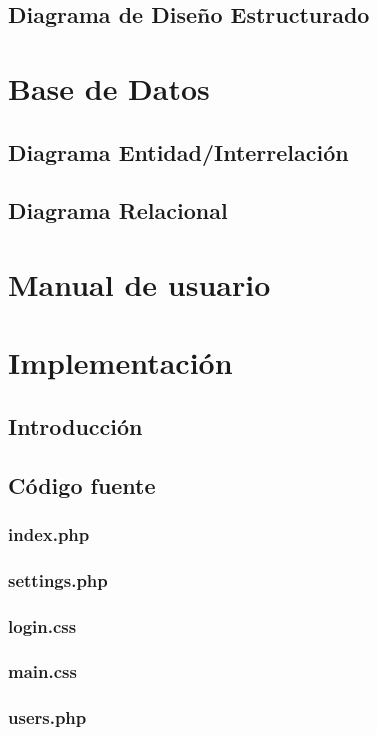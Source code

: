 \documentclass[12pt,a4paper,spanish,twoside]{article}
\begin{document}
\subsection{Diagrama de Diseño Estructurado}

\section{Base de Datos}
\subsection{Diagrama Entidad/Interrelación}
\subsection{Diagrama Relacional}

\section{Manual de usuario}

\section{Implementación}
\subsection{Introducción}
\subsection{Código fuente}
\subsubsection{index.php}

\subsubsection{settings.php}

\subsubsection{login.css}
%
\subsubsection{main.css}
%
\subsubsection{users.php}
%
\end{document}
